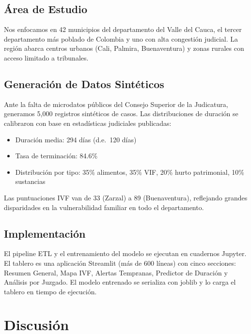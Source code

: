 \documentclass[runningheads]{llncs}
\begin{document}
\subsection{\'Area de Estudio}

Nos enfocamos en 42 municipios del departamento del Valle del Cauca, el tercer departamento m\'{a}s poblado de Colombia y uno con alta congesti\'{o}n judicial. La regi\'{o}n abarca centros urbanos (Cali, Palmira, Buenaventura) y zonas rurales con acceso limitado a tribunales.

\subsection{Generaci\'{o}n de Datos Sint\'{e}ticos}

Ante la falta de microdatos p\'{u}blicos del Consejo Superior de la Judicatura, generamos 5,000 registros sint\'{e}ticos de casos. Las distribuciones de duraci\'{o}n se calibraron con base en estad\'{i}sticas judiciales publicadas:

\begin{itemize}
    \item Duraci\'{o}n media: 294 d\'{i}as (d.e.\ 120 d\'{i}as)
    \item Tasa de terminaci\'{o}n: 84.6\%
    \item Distribuci\'{o}n por tipo: 35\% alimentos, 35\% VIF, 20\% hurto patrimonial, 10\% sustancias
\end{itemize}

Las puntuaciones IVF van de 33 (Zarzal) a 89 (Buenaventura), reflejando grandes disparidades en la vulnerabilidad familiar en todo el departamento.

\subsection{Implementaci\'{o}n}

El pipeline ETL y el entrenamiento del modelo se ejecutan en cuadernos Jupyter. El tablero es una aplicaci\'{o}n Streamlit (m\'{a}s de 600 l\'{i}neas) con cinco secciones: Resumen General, Mapa IVF, Alertas Tempranas, Predictor de Duraci\'{o}n y An\'{a}lisis por Juzgado. El modelo entrenado se serializa con joblib y lo carga el tablero en tiempo de ejecuci\'{o}n.

\section{Discusi\'{o}n}
\end{document}
